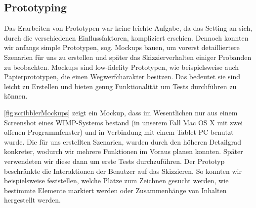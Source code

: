 \subsection{Prototyping}
Das Erarbeiten von Prototypen war keine leichte Aufgabe, da das Setting an sich, durch die verschiedenen Einflussfaktoren, kompliziert erschien. Dennoch konnten wir anfangs simple Prototypen, sog. Mockups bauen, um vorerst detailliertere Szenarien für uns zu erstellen und später das Skizzierverhalten einiger Probanden zu beobachten. Mockups sind low-fidelity Prototypen, wie beispielsweise auch Papierprototypen, die einen Wegwerfcharakter besitzen. Das bedeutet sie sind leicht zu Erstellen und bieten genug Funktionalität um Tests durchführen zu können.

\medskip \autoref{fig:scribblerMockups} zeigt ein Mockup, dass im Wesentlichen nur aus einem Screenshot eines \acs{WIMP}-Systems bestand (in unserem Fall Mac OS X mit zwei offenen Programmfenster) und in Verbindung mit einem Tablet PC benutzt wurde. Die für uns erstellten Szenarien, wurden durch den höheren Detailgrad konkreter, wodurch wir mehrere Funktionen im Voraus planen konnten. Später verwendeten wir diese dann um erste Tests durchzuführen. Der Prototyp beschränkte die Interaktionen der Benutzer auf das Skizzieren. So konnten wir beispielsweise feststellen, welche Plätze zum Zeichnen gesucht werden, wie bestimmte Elemente markiert werden oder Zusammenhänge von Inhalten hergestellt werden.

